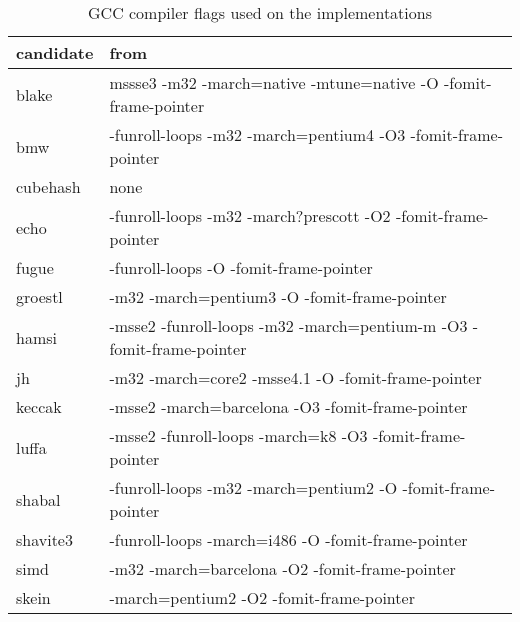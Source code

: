 \begin{table}
  \centering
  \begin{tabular}{ | l | l | }
    \hline
    \textbf{candidate} & \textbf{from}  \\ \hline
     blake       & mssse3 -m32 -march=native -mtune=native -O -fomit-frame-pointer  \\ \hline
     bmw         & -funroll-loops -m32 -march=pentium4 -O3 -fomit-frame-pointer     \\ \hline
     cubehash    & none                                                             \\ \hline
     echo        & -funroll-loops -m32 -march?prescott -O2 -fomit-frame-pointer     \\ \hline
     fugue       & -funroll-loops -O -fomit-frame-pointer                           \\ \hline
     groestl     & -m32 -march=pentium3 -O -fomit-frame-pointer                     \\ \hline
     hamsi       & -msse2 -funroll-loops -m32 -march=pentium-m -O3 -fomit-frame-pointer\\ \hline
     jh          & -m32 -march=core2 -msse4.1 -O -fomit-frame-pointer               \\ \hline
     keccak      & -msse2 -march=barcelona -O3 -fomit-frame-pointer                 \\ \hline
     luffa       & -msse2 -funroll-loops -march=k8 -O3 -fomit-frame-pointer         \\ \hline
     shabal      & -funroll-loops -m32 -march=pentium2 -O -fomit-frame-pointer      \\ \hline
     shavite3    & -funroll-loops -march=i486 -O -fomit-frame-pointer               \\ \hline
     simd        & -m32 -march=barcelona -O2 -fomit-frame-pointer                   \\ \hline
     skein       & -march=pentium2 -O2 -fomit-frame-pointer                         \\ \hline
  \end{tabular}
  \caption{\ac{GCC} compiler flags used on the implementations}
  \label{tbl:sha3:compilerflags}
\end{table}
